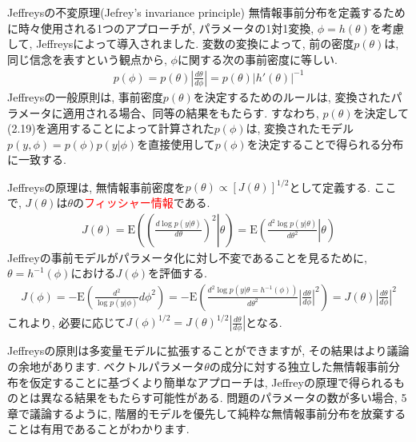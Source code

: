 \documentclass[10pt,dvipdfmx,a4]{beamer}
\newcommand{\eq}[1]{\begin{align}#1\end{align}}
\newcommand{\eqn}[1]{\begin{align*}#1\end{align*}}
\newcommand{\tcr}[1]{\textcolor{red}{#1}}
\begin{document}

\begin{frame}{Jeffreysの不変原理(Jefrey's invariance principle)}
無情報事前分布を定義するために時々使用される1つのアプローチが, パラメータの1対1変換, $\phi=h(\theta)$を考慮して, Jeffreysによって導入されました.
変数の変換によって, 前の密度$p(\theta)$は, 同じ信念を表すという観点から, $\phi$に関する次の事前密度に等しい.
\eq{p(\phi)=p(\theta)\left|\frac{d\theta}{d\phi}\right|=p(\theta)|h'(\theta)|^{-1}}
Jeffreysの一般原則は, 事前密度$p(\theta)$を決定するためのルールは, 変換されたパラメータに適用される場合、同等の結果をもたらす.
すなわち, $p(\theta)$を決定して(2.19)を適用することによって計算された$p(\phi)$は, 変換されたモデル$p(y, \phi)=p(\phi)p(y|\phi)$を直接使用して$p(\phi)$を決定することで得られる分布に一致する.
\end{frame}


\begin{frame}
Jeffreysの原理は, 無情報事前密度を$p(\theta)\propto[J(\theta)]^{1/2}$として定義する.
ここで, $J(\theta)$は$\theta$の\tcr{フィッシャー情報}である.
\eq{J(\theta)=\text{E}\left(\left(\left. \frac{d\log p(y|\theta)}{d\theta}\right)^2\right|\theta\right)=\text{E}\left(\left.\frac{d^2\log p(y|\theta)}{d\theta^2}\right|\theta\right)}
Jeffreyの事前モデルがパラメータ化に対し不変であることを見るために, $\theta=h^{-1}(\phi)$における$J(\phi)$を評価する.
\eqn{J(\phi)=-\text{E}\left(\frac{d^2}{\log p(y|\phi)}{d\phi^2}\right)
=-\text{E}\left(\frac{d^2 \log p(y|\theta=h^{-1}(\phi))}{d\theta^2}\left|\frac{d\theta}{d\phi}\right|^2\right)
=J(\theta)\left|\frac{d\theta}{d\phi}\right|^2}
これより, 必要に応じて$J(\phi)^{1/2}=J(\theta)^{1/2}\left|\frac{d\theta}{d\phi}\right|$となる.

Jeffreysの原則は多変量モデルに拡張することができますが, その結果はより議論の余地があります.
ベクトルパラメータ$\theta$の成分に対する独立した無情報事前分布を仮定することに基づくより簡単なアプローチは, Jeffreyの原理で得られるものとは異なる結果をもたらす可能性がある.
問題のパラメータの数が多い場合, 5章で議論するように, 階層的モデルを優先して純粋な無情報事前分布を放棄することは有用であることがわかります.
\end{frame}

\end{document}
